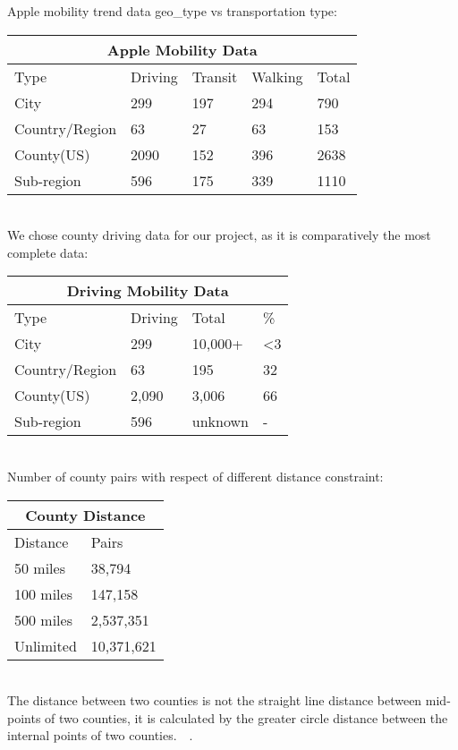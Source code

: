Apple mobility trend data geo\_type vs transportation type: \\
\begin{tabular}{ |p{2.5cm}||p{1cm}|p{1cm}|p{1cm}|p{1cm}|  }
 \hline
 \multicolumn{5}{|c|}{Apple Mobility Data} \\
 \hline
 Type    & Driving & Transit & Walking & Total\\
 \hline
 City & 299 & 197 & 294 & 790\\
 \hline
 Country/Region & 63 & 27 & 63 & 153\\
 \hline
 County(US) & 2090 & 152 & 396 & 2638\\
 \hline
 Sub-region & 596 & 175 & 339 & 1110\\
 \hline
\end{tabular}\\

We chose county driving data for our project, as it is comparatively the most complete data:  \\
\begin{tabular}{ |p{2.5cm}||p{1cm}|p{1.5cm}|p{1cm}|  }
 \hline
 \multicolumn{4}{|c|}{Driving Mobility Data} \\
 \hline
 Type    & Driving & Total & \% \\
 \hline
 City & 299 & 10,000+ & <3\\
 \hline
 Country/Region & 63 & 195 & 32\\
 \hline
 County(US) & 2,090 & 3,006 & 66\\
 \hline
 Sub-region & 596 & unknown & -\\
 \hline
\end{tabular}\\

Number of county pairs with respect of different distance constraint: \\
\begin{tabular}{ |p{3cm}||p{3cm}|  }
 \hline
 \multicolumn{2}{|c|}{County Distance} \\
 \hline
 Distance    & Pairs \\
 \hline
 50 miles & 38,794\\
 \hline
 100 miles & 147,158\\
 \hline
 500 miles & 2,537,351\\
 \hline
 Unlimited & 10,371,621\\
 \hline
\end{tabular}\\

The distance between two counties is not the straight line distance between mid-points of two counties, it is calculated by the greater circle distance between the internal points of two counties.~\cite{nber}~\cite{internalpoint}.


